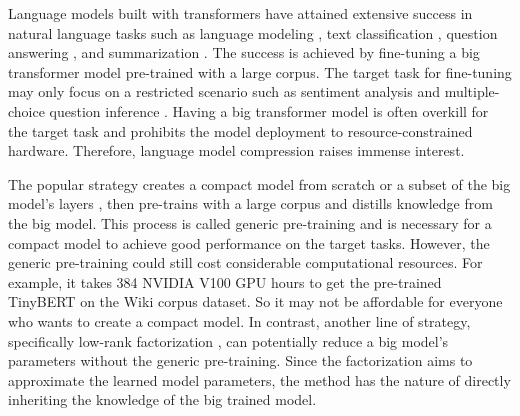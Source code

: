 \documentclass{article} %
\begin{document}
Language models built with transformers \citep{devlin2018bert} have attained extensive success in natural language tasks such as language modeling \citep{radford2018improving}, text classification \citep{wang2018glue}, question answering \citep{rajpurkar2016squad}, and summarization \citep{liu2019fine}. The success is achieved by fine-tuning a big transformer model pre-trained with a large corpus. The target task for fine-tuning may only focus on a restricted scenario such as sentiment analysis \citep{socher2013recursive} and multiple-choice question inference \citep{zellers2018swag}. Having a big transformer model is often overkill for the target task and prohibits the model deployment to resource-constrained hardware. Therefore, language model compression raises immense interest.

The popular strategy creates a compact model from scratch \citep{jiao2019tinybert} or a subset of the big model's layers \citep{sun2019patient,sanh2019distilbert}, then pre-trains with a large corpus and distills knowledge from the big model. This process is called generic pre-training \citep{wang2020minilm,sun2019patient,sanh2019distilbert} and is necessary for a compact model to achieve good performance on the target tasks. However, the generic pre-training could still cost considerable computational resources. For example, it takes 384 NVIDIA V100 GPU hours to get the pre-trained TinyBERT \citep{jiao2019tinybert} on the Wiki corpus dataset. So it may not be affordable for everyone who wants to create a compact model. In contrast, another line of strategy, specifically low-rank factorization \citep{golub1971singular,noach2020compressing}, can potentially reduce a big model's parameters without the generic pre-training. Since the factorization aims to approximate the learned model parameters, the method has the nature of directly inheriting the knowledge of the big trained model. 
\end{document}
